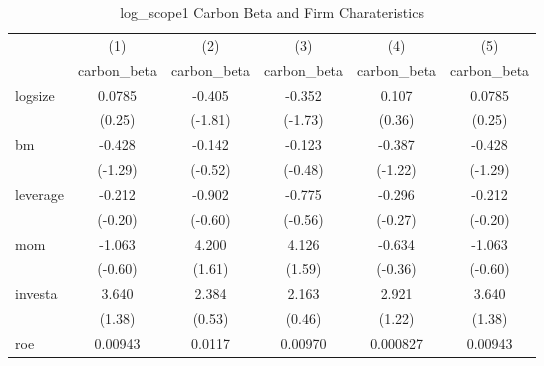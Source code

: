 \begin{table}[htbp]\centering
\def\sym#1{\ifmmode^{#1}\else\(^{#1}\)\fi}
\caption{log\_scope1 Carbon Beta and Firm Charateristics}
\begin{tabular}{l*{5}{c}}
\hline\hline
                    &\multicolumn{1}{c}{(1)}&\multicolumn{1}{c}{(2)}&\multicolumn{1}{c}{(3)}&\multicolumn{1}{c}{(4)}&\multicolumn{1}{c}{(5)}\\
                    &\multicolumn{1}{c}{carbon\_beta}&\multicolumn{1}{c}{carbon\_beta}&\multicolumn{1}{c}{carbon\_beta}&\multicolumn{1}{c}{carbon\_beta}&\multicolumn{1}{c}{carbon\_beta}\\
\hline
logsize             &      0.0785         &      -0.405         &      -0.352         &       0.107         &      0.0785         \\
                    &      (0.25)         &     (-1.81)         &     (-1.73)         &      (0.36)         &      (0.25)         \\
[1em]
bm                  &      -0.428         &      -0.142         &      -0.123         &      -0.387         &      -0.428         \\
                    &     (-1.29)         &     (-0.52)         &     (-0.48)         &     (-1.22)         &     (-1.29)         \\
[1em]
leverage            &      -0.212         &      -0.902         &      -0.775         &      -0.296         &      -0.212         \\
                    &     (-0.20)         &     (-0.60)         &     (-0.56)         &     (-0.27)         &     (-0.20)         \\
[1em]
mom                 &      -1.063         &       4.200         &       4.126         &      -0.634         &      -1.063         \\
                    &     (-0.60)         &      (1.61)         &      (1.59)         &     (-0.36)         &     (-0.60)         \\
[1em]
investa             &       3.640         &       2.384         &       2.163         &       2.921         &       3.640         \\
                    &      (1.38)         &      (0.53)         &      (0.46)         &      (1.22)         &      (1.38)         \\
[1em]
roe                 &     0.00943         &      0.0117         &     0.00970         &    0.000827         &     0.00943         \\

\end{tabular}
\end{table}
